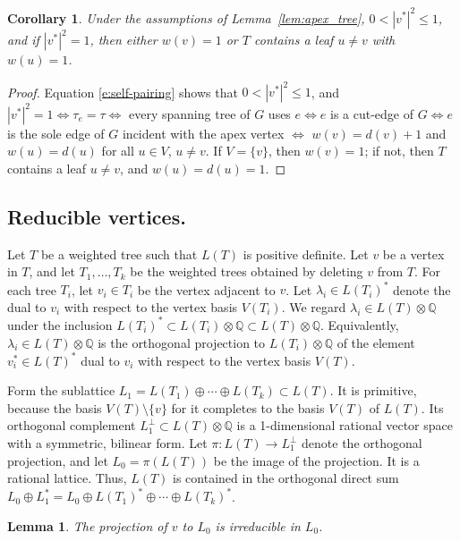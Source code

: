 \documentclass[11pt]{amsart}
\newtheorem{cor}[thm]{Corollary}
\newtheorem{lem}[thm]{Lemma}
\numberwithin{equation}{section}
\def\bQ{{\mathbb Q}}
\begin{document}
\begin{cor}
\label{cor:tight}
Under the assumptions of Lemma~\ref{lem:apex_tree}, $0 < |v^*|^2 \le 1$, and if $|v^*|^2 =1$, then either $w(v) = 1$ or $T$ contains a leaf $u \ne v$ with $w(u)=1$.
\end{cor}

\begin{proof}
    Equation \eqref{e:self-pairing} shows that $0 < |v^*|^2 \le 1$, and $|v^*|^2=1 \iff \tau_e = \tau \iff$ every spanning tree of $G$ uses $e \iff e$ is a cut-edge of $G \iff  e$ is the sole edge of $G$ incident with the apex vertex $\iff$ $w(v) = d(v)+1$ and $w(u) = d (u)$ for all $u \in V$, $u \ne v$.
    If $V = \{v\}$, then $w(v)=1$; if not, then $T$ contains a leaf $u \ne v$, and $w(u) = d(u) = 1$.
\end{proof}

\subsection{Reducible vertices.}
\label{sec:reducible}
Let $T$ be a weighted tree such that $L(T)$ is positive definite. Let $v$ be a vertex in $T$, and let $T_1,\dots, T_k$ be the weighted trees obtained by deleting $v$ from $T$.
For each tree $T_i$, let $v_i\in T_i$ be the vertex adjacent to $v$.
Let $\lambda_i \in L(T_i)^*$ denote the dual to $v_i$ with respect to the vertex basis $V(T_i)$.
We regard $\lambda_i \in L(T) \otimes \bQ$ under the inclusion $L(T_i)^* \subset L(T_i) \otimes \bQ \subset L(T) \otimes \bQ$.
Equivalently, $\lambda_i \in L(T) \otimes \bQ$ is the orthogonal projection to $L(T_i) \otimes \bQ$ of the element $v_i^* \in L(T)^*$ dual to $v_i$ with respect to the vertex basis $V(T)$.

Form the sublattice $L_1 = L(T_1) \oplus \cdots \oplus L(T_k) \subset L(T)$. 
It is primitive, because the basis $V(T) \setminus \{v\}$ for it completes to the basis $V(T)$ of $L(T)$.
Its orthogonal complement $L_1^\perp \subset L(T) \otimes \bQ$ is a 1-dimensional rational vector space with a symmetric, bilinear form.
Let $\pi : L(T) \rightarrow L_1^\perp$ denote the orthogonal projection, and let $L_0=\pi(L(T))$ be the image of the projection.
It is a rational lattice.
Thus, $L(T)$ is contained in the orthogonal direct sum $L_0 \oplus L_1^* = L_0 \oplus L(T_1)^* \oplus \cdots \oplus L(T_k)^*$.

\begin{lem}
\label{lem:irred}
    The projection of $v$ to $L_0$ is irreducible in $L_0$.
\end{lem}
\end{document}
